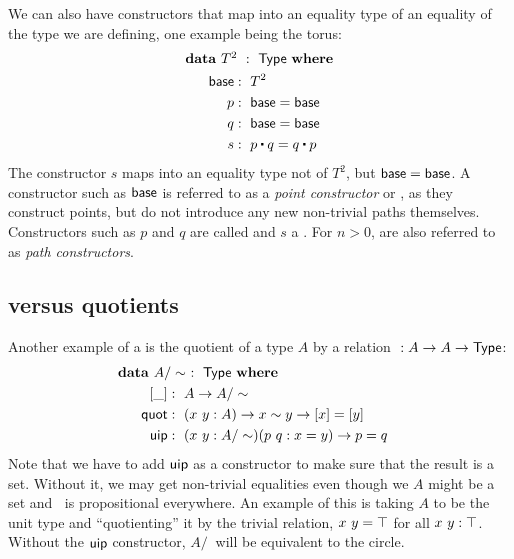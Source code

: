 \documentclass[a4paper,10pt]{article}
\begin{document}
We can also have constructors that map into an equality type of an
equality of the type we are defining, one example being the torus:
%
\begin{alignat*}{2}
  &\rlap{$\data\ T^2\ :\ \Type\ \where$} \\
  &&\ \ \base     &:\ T^2 \\
  &&\ \ p         &:\ \base = \base \\
  &&\ \ q         &:\ \base = \base \\
  &&\ \ s         &:\ p \ct q = q \ct p
\end{alignat*}
%
The constructor $s$ maps into an equality type not of $T^2$, but
$\mathsf{base} = \mathsf{base}$. A constructor such as $\mathsf{base}$ is referred to as a
\emph{point constructor} or \emph{\zeroconstructor}, as they construct
points, but do not introduce any new non-trivial paths
themselves. Constructors such as $p$ and $q$ are called
\emph{\oneconstructors} and $s$ a \emph{}. For
$n > 0$,  are also referred to as \emph{path
  constructors}.

\subsection{\Hits versus quotients}
\label{sec:quotients}

Another example of a \hit is the quotient of a type $A$ by a relation
$~ : A \to A \to \mathsf{Type}$:
\begin{alignat*}{2}
  &\rlap{$\data\ A/\sim\ :\ \Type\ \where$} \\
  &&\ \ [\_]  &:\ A \to A/\sim \\
  &&\ \ \quot &:\ (x\ y : A) \to x \sim y \to [ x ] = [ y ] \\
  &&\ \ \uipc  &:\ (x\ y : A/\sim) (p\ q : x = y) \to p = q
\end{alignat*}
%
Note that we have to add $\operatorname{\mathsf{uip}}$ as a constructor to make sure that the
result is a set. Without it, we may get non-trivial equalities even
though we $A$ might be a set and $~$ is propositional everywhere. An
example of this is taking $A$ to be the unit type and ``quotienting''
it by the trivial relation, \ie $x ~ y = \top$ for all
$x\ y : \top$. Without the $\operatorname{\mathsf{uip}}$ constructor, $A/~$ will be
equivalent to the circle.
\end{document}
